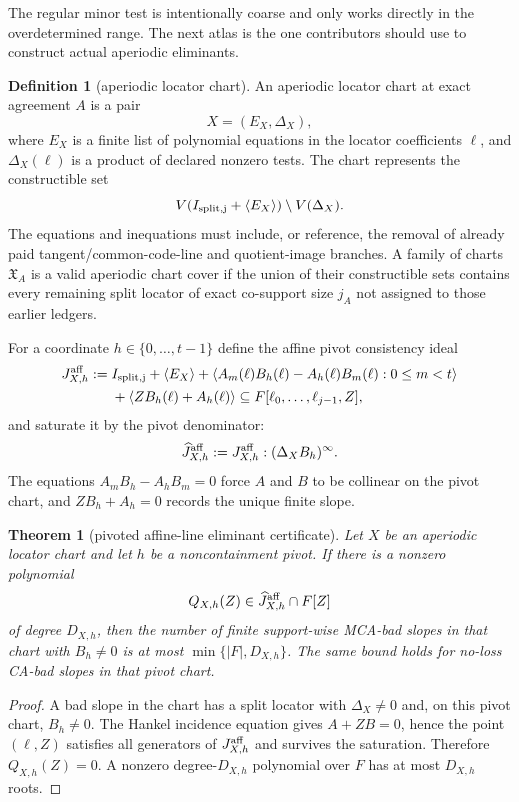 \documentclass[11pt]{article}
\newtheorem{theorem}{Theorem}[section]
\theoremstyle{definition}
\newtheorem{definition}[definition]{Definition}
\theoremstyle{remark}
\begin{document}
The regular minor test is intentionally coarse and only works directly in the
overdetermined range.  The next atlas is the one contributors should use to
construct actual aperiodic eliminants.

\begin{definition}[aperiodic locator chart]
\label{def:aperiodic-locator-chart}
An aperiodic locator chart at exact agreement $A$ is a pair
\[
        X=(E_X,\Delta_X),
\]
where $E_X$ is a finite list of polynomial equations in the locator coefficients
$\ell$, and $\Delta_X(\ell)$ is a product of declared nonzero tests.  The chart
represents the constructible set
\[
        V(I_{\rm split,j}+\langle E_X\rangle)\setminus V(\Delta_X).
\]
The equations and inequations must include, or reference, the removal of already
paid tangent/common-code-line and quotient-image branches.  A family of charts
$\mathfrak X_A$ is a valid aperiodic chart cover if the union of their
constructible sets contains every remaining split locator of exact co-support
size $j_A$ not assigned to those earlier ledgers.
\end{definition}

For a coordinate $h\in\{0,\ldots,t-1\}$ define the affine pivot consistency ideal
\[
\begin{aligned}
        J^{\rm aff}_{X,h}:={}&
        I_{\rm split,j}+\langle E_X\rangle
        +\langle A_m(\ell)B_h(\ell)-A_h(\ell)B_m(\ell):0\le m<t\rangle \\
        &+\langle ZB_h(\ell)+A_h(\ell)\rangle
        \subseteq F[\ell_0,\ldots,\ell_{j-1},Z],
\end{aligned}
\]
and saturate it by the pivot denominator:
\[
        \widehat J^{\rm aff}_{X,h}:=
        J^{\rm aff}_{X,h}:(\Delta_X B_h)^\infty .
\]
The equations $A_mB_h-A_hB_m=0$ force $A$ and $B$ to be collinear on the pivot
chart, and $ZB_h+A_h=0$ records the unique finite slope.

\begin{theorem}[pivoted affine-line eliminant certificate]
\label{thm:aperiodic-affine-eliminant}
Let $X$ be an aperiodic locator chart and let $h$ be a noncontainment pivot.  If
there is a nonzero polynomial
\[
        Q_{X,h}(Z)\in \widehat J^{\rm aff}_{X,h}\cap F[Z]
\]
of degree $D_{X,h}$, then the number of finite support-wise MCA-bad slopes in
that chart with $B_h\ne0$ is at most $\min\{|F|,D_{X,h}\}$.  The same bound holds
for no-loss CA-bad slopes in that pivot chart.
\end{theorem}

\begin{proof}
A bad slope in the chart has a split locator with $\Delta_X\ne0$ and, on this
pivot chart, $B_h\ne0$.  The Hankel incidence equation gives
$A+ZB=0$, hence the point $(\ell,Z)$ satisfies all generators of
$J^{\rm aff}_{X,h}$ and survives the saturation.  Therefore $Q_{X,h}(Z)=0$.
A nonzero degree-$D_{X,h}$ polynomial over $F$ has at most $D_{X,h}$ roots.
\end{proof}
\end{document}
